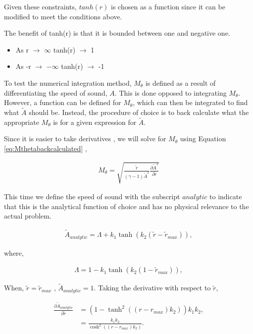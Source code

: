 \documentclass[12pt]{article}
\begin{document}
Given these constraints, $tanh(r)$ is chosen as a function since it can be
modified to meet the conditions above.

The benefit of tanh(r) is that it is bounded between one and negative one. 
\begin{itemize}
    \item As r $\rightarrow$ $\infty$ tanh(r) $\rightarrow$ 1
    \item As -r $\rightarrow$ $-\infty$ tanh(r) $\rightarrow$ -1
\end{itemize}

To test the numerical integration method,  $M_{\theta}$ is defined as a result 
of differentiating the speed of sound, $A$. This is done opposed to integrating
$M_{\theta}$. However, a function can be defined for $M_{\theta}$, which can 
then be integrated to find what $\widetilde{A}$ should be. 
Instead, the procedure of choice is to back calculate what the appropriate 
$M_{\theta}$ is for a given expression for $\widetilde{A}$.

Since it is easier to take derivatives , we will solve for $M_{\theta}$ using 
Equation \ref{eq:Mthetabackcalculated} ,

\begin{align*}
    M_{\theta} = \sqrt{ \frac{\widetilde{r}}{(\gamma -1) \widetilde{A}^2} 
    \frac{\partial \widetilde{A}^2}{\partial \widetilde{r}}}
\end{align*}

This time we define the speed of sound with the subscript $analytic$ to indicate 
that this is the analytical function of choice and has no physical relevance 
to the actual problem.

\begin{align*}
\widetilde{A}_{analytic} = \Lambda + k_1 \tanh \left( k_2 \left( \widetilde{r} - \widetilde{r}_{max} \right) \right),
\end{align*}

where, 

\begin{align*}
    \Lambda = 1 - k_1 \tanh(k_2 (1 - \widetilde{r}_{max})),
\end{align*}

When, $\widetilde{r}=\widetilde{r}_{max}$ , $\widetilde{A}_{analytic} = 1$.  
Taking the derivative with respect to $\widetilde{r}$,

\begin{align*}
    \frac{\partial \widetilde{A}_{analytic} }{\partial \widetilde{r}} &=
    \left(1 - \tanh^{2}{\left(\left(r - r_{max}\right) {k}_{2} \right)}\right) {k}_{1} {k}_{2}, \\ 
    &= \frac{ k_{1} k_{2}}{\cosh^{2}{\left(\left(r - r_{max}\right) {k}_{2} \right)}}.
\end{align*}
\end{document}
